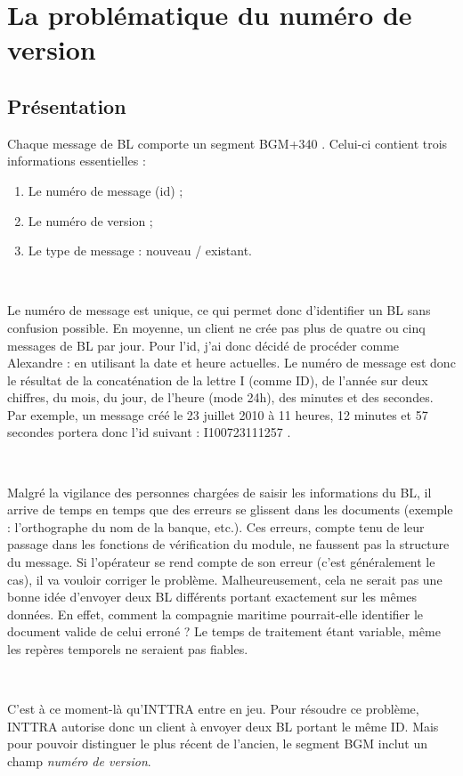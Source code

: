 \section{La problématique du numéro de version}
\subsection{Présentation}
Chaque message de BL comporte un segment \og BGM+340 \fg. Celui-ci contient trois informations essentielles :
\begin{enumerate}
	\item Le numéro de message (id) ;
	\item Le numéro de version ;
	\item Le type de message : nouveau / existant.
\end{enumerate}

~

Le numéro de message est unique, ce qui permet donc d'identifier un BL sans confusion possible. En moyenne, un client ne crée pas plus de quatre ou cinq messages de BL par jour. Pour l'id, j'ai donc décidé de procéder comme Alexandre : en utilisant la date et heure actuelles. Le numéro de message est donc le résultat de la concaténation de la lettre I (comme ID), de l'année sur deux chiffres, du mois, du jour, de l'heure (mode 24h), des minutes et des secondes. Par exemple, un message créé le 23 juillet 2010 à 11 heures, 12 minutes et 57 secondes portera donc l'id suivant : \og I100723111257 \fg.

~

Malgré la vigilance des personnes chargées de saisir les informations du BL, il arrive de temps en temps que des erreurs se glissent dans les documents (exemple : l'orthographe du nom de la banque, etc.). Ces erreurs, compte tenu de leur passage dans les fonctions de vérification du module, ne faussent pas la structure du message. Si l'opérateur se rend compte de son erreur (c'est généralement le cas), il va vouloir corriger le problème. Malheureusement, cela ne serait pas une bonne idée d'envoyer deux BL différents portant exactement sur les mêmes données. En effet, comment la compagnie maritime pourrait-elle identifier le document valide de celui erroné ? Le temps de traitement étant variable, même les repères temporels ne seraient pas fiables.

~

C'est à ce moment-là qu'INTTRA entre en jeu. Pour résoudre ce problème, INTTRA autorise donc un client à envoyer deux BL portant le même ID. Mais pour pouvoir distinguer le plus récent de l'ancien, le segment BGM inclut un champ \emph{numéro de version}.

